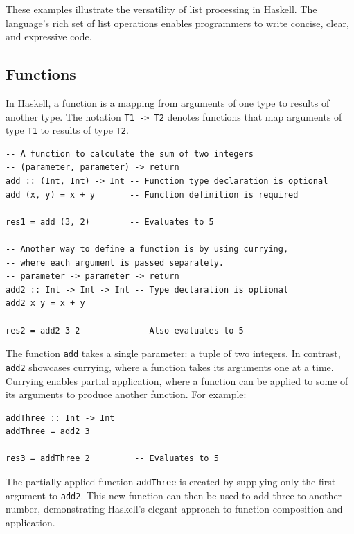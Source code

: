 \documentclass[a4paper, 10pt]{article}
\begin{document}
            \noindent These examples illustrate the versatility of list processing in Haskell. The language's rich set of list operations enables programmers to write concise, clear, and expressive code.

            \newpage

    \subsection{Functions}

        In Haskell, a function is a mapping from arguments of one type to results of another type. The notation \texttt{T1 -> T2} denotes functions that map arguments of type \texttt{T1} to results of type \texttt{T2}.

        \lstset{language=Haskell}
        \begin{lstlisting}
-- A function to calculate the sum of two integers
-- (parameter, parameter) -> return
add :: (Int, Int) -> Int -- Function type declaration is optional
add (x, y) = x + y       -- Function definition is required

res1 = add (3, 2)        -- Evaluates to 5

-- Another way to define a function is by using currying,
-- where each argument is passed separately.
-- parameter -> parameter -> return
add2 :: Int -> Int -> Int -- Type declaration is optional
add2 x y = x + y

res2 = add2 3 2           -- Also evaluates to 5
        \end{lstlisting}

        \noindent The function \texttt{add} takes a single parameter: a tuple of two integers. In contrast, \texttt{add2} showcases currying, where a function takes its arguments one at a time. Currying enables partial application, where a function can be applied to some of its arguments to produce another function. For example:

        \begin{lstlisting}
addThree :: Int -> Int
addThree = add2 3

res3 = addThree 2         -- Evaluates to 5
        \end{lstlisting}

        \noindent The partially applied function \texttt{addThree} is created by supplying only the first argument to \texttt{add2}. This new function can then be used to add three to another number, demonstrating Haskell's elegant approach to function composition and application.
        \newpage
\end{document}
